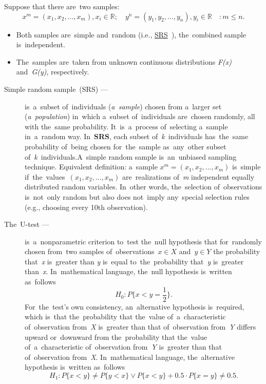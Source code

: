 \documentclass[russian,english]{scrreprt}
\begin{document}
Suppose that there are~two samples:
\begin{equation*}
x^{m} = (x_{1},x_{2},\ldots,x_{m}), x_{i} \in \mathbb{R};\quad y^{n} = (y_{1},y_{2},\ldots,y_{n}), y_{i} \in \mathbb{R} \quad: m \leq n.
\end{equation*}
%
\begin{itemize}
	\item Both samples are~simple and~random (i.e., \href{https://en.wikipedia.org/wiki/Simple_random_sample}{SRS}~\cite{Wiki:SRS}), the~combined sample is~independent.
	\item The~samples are~taken from unknown continuous distributions \textit{F(x)} and~\textit{G(y)}, respectively.
\end{itemize}
%
\begin{description}
	\item[Simple random sample~(SRS) ---] is~a~subset of~individuals (\emph{a~sample}) chosen from a~larger set (\emph{a~population}) in~which a~subset of~individuals are~chosen randomly, all with the~same probability. It~is~a~process of~selecting a~sample in~a~random way. In~\textbf{SRS}, each subset of~\textit{k}~individuals has~the~same probability of~being chosen for~the~sample as~any~other subset of~\textit{k}~individuals.A~simple random sample is~an~unbiased sampling technique. Equivalent definition: a~sample ${\textstyle x^{m} = (x_{1},x_{2},\ldots,x_{m})}$ is~simple if~the~values~${\textstyle (x_{1},x_{2},\ldots,x_{m})}$ are~realizations of~\textit{m} independent equally distributed random variables. In~other words, the~selection of~observations is~not~only random but also does not~imply any~special selection rules (e.g., choosing every 10th observation).
\end{description}
%
\begin{description}
	\item[The~U-test ---] is~a~nonparametric criterion to~test the~null hypothesis that for~randomly chosen from~two samples of~observations~$x \in X$ and~$y \in Y$ the probability that~\textit{x} is~greater than \textit{y} is~equal to~the~probability that~\textit{y} is~greater than~\textit{x}. In~mathematical language, the~null hypothesis is~written as~follows
	\begin{equation}\label{eq:U-test-null-hypothesis}
	H_{0}:P\{x<y=\frac{1}{2}\}.
	\end{equation}
	For~the~test's own consistency, an~alternative hypothesis is~required, which is~that the~probability that the~value of~a~characteristic of~observation from~\textit{X} is~greater than that of~observation from~\textit{Y} differs upward or~downward from the~probability that the~value of~a~characteristic of~observation from~\textit{Y} is~greater than that of~observation from~\textit{X}. In~mathematical language, the~alternative hypothesis is~written as~follows
	\begin{equation}\label{eq:U-test-alt-hypothesis}
	H_{1}:P\{x<y\} \neq P\{y<x\} \vee P\{x<y\} + 0.5 \cdot P\{x=y\} \neq 0.5.
	\end{equation}
\end{description}
\end{document}
